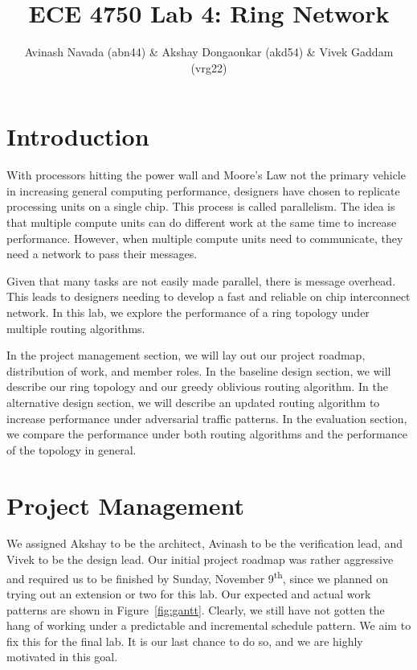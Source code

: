 \documentclass[10pt]{article}
\begin{document}
\title{ECE 4750 Lab 4: Ring Network}
\author{Avinash Navada (abn44) \& Akshay Dongaonkar (akd54) \& Vivek Gaddam (vrg22)}
\maketitle


\section{Introduction}

With processors hitting the power wall and Moore's Law not the primary vehicle
in increasing general computing performance, designers have chosen to
replicate processing units on a single chip. 
This process is called parallelism. 
The idea is that multiple compute units can do different work at the same time
to increase performance.
However, when multiple compute units need to communicate, they need a network
to pass their messages. \par

Given that many tasks are not easily made parallel, there is message overhead.
This leads to designers needing to develop a fast and reliable
on chip interconnect network.
In this lab, we explore the performance of a ring topology under multiple
routing algorithms. \par

In the project management section, we will lay out our project roadmap,
distribution of work, and member roles.
In the baseline design section, we will describe our ring topology and our 
greedy oblivious routing algorithm.
In the alternative design section, we will describe an updated routing 
algorithm to increase performance under adversarial traffic patterns.
In the evaluation section, we compare the performance under both routing
algorithms and the performance of the topology in general.


\section{Project Management}

We assigned Akshay to be the architect,
Avinash to be the verification lead,
and Vivek to be the design lead.
Our initial project roadmap was rather aggressive and required us to be 
finished by Sunday, November 9\textsuperscript{th}, since we planned on 
trying out an extension or two for this lab. 
Our expected and actual work patterns are shown in Figure~\ref{fig:gantt}.
Clearly, we still have not gotten the hang of working under a predictable
and incremental schedule pattern.
We aim to fix this for the final lab.
It is our last chance to do so, and we are highly motivated in this goal.
 \par
\end{document}
